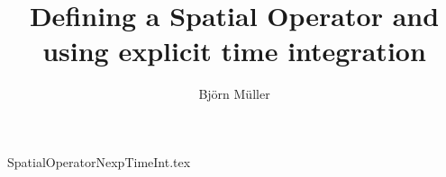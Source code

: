 \documentclass[10pt,a4paper]{article}
\title{Defining a Spatial Operator and using explicit time integration}
\author{Björn Müller}
\begin{document}
\maketitle

{SpatialOperatorNexpTimeInt.tex}
\end{document}
